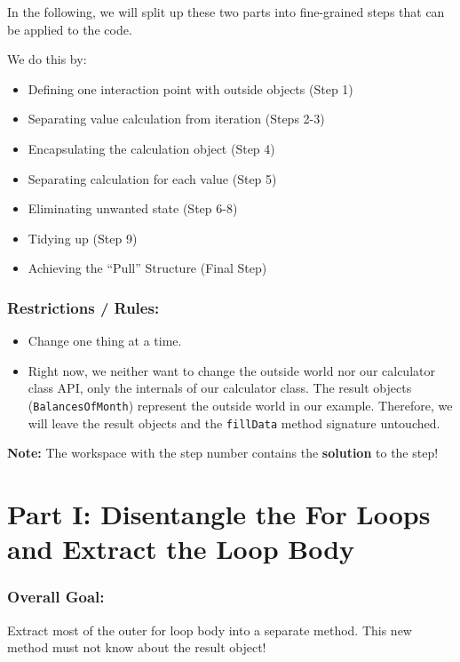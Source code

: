 \documentclass[a4paper,fleqn,titlepage,11pt]{article}
\begin{document}
In the following, we will split up these two parts into fine-grained steps that can be applied to the code.

We do this by:
\begin{itemize}
	\item Defining one interaction point with outside objects (Step 1)
	\item Separating value calculation from iteration (Steps 2-3)
	\item Encapsulating the calculation object (Step 4)
	\item Separating calculation for each value (Step 5)
	\item Eliminating unwanted state (Step 6-8)
	\item Tidying up (Step 9)
	\item Achieving the ``Pull'' Structure (Final Step)
\end{itemize}

\subsubsection*{Restrictions / Rules:}


\begin{itemize}
\item Change one thing at a time.

\item Right now, we neither want to change the outside world nor our calculator class API, only the internals of our calculator class. The result objects (\texttt{BalancesOfMonth}) represent the outside world in our example. Therefore, we will leave the result objects and the \texttt{fillData} method signature untouched. 
\end{itemize}


\textbf{Note:} The workspace with the step number contains the \textbf{solution} to the step!

\clearpage
\section*{Part I: Disentangle the For Loops and Extract the Loop Body}

\subsubsection*{Overall Goal:}

Extract most of the outer for loop body into a separate method. This new method must not know about the result object!
\end{document}
